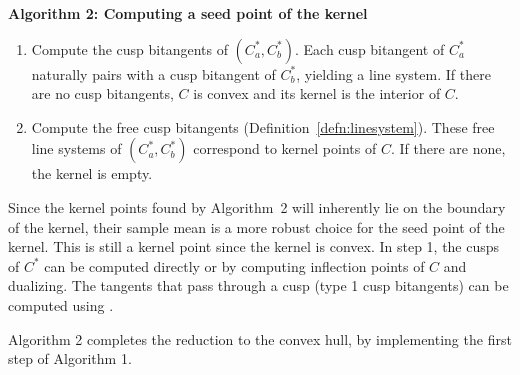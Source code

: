 \documentclass{sig-alternate}
\newcommand{\Comment}[1]{\relax}  %
\begin{document}
\vspace{.2in}

\centerline{{\bf Algorithm 2: Computing a seed point of the kernel}}

\begin{enumerate}
\item	Compute the cusp bitangents of $(C_a^*, C_b^*)$.
	Each cusp bitangent of $C^*_a$ naturally pairs with a cusp bitangent
	of $C^*_b$, yielding a line system.
	If there are no cusp bitangents, $C$ is convex and its kernel is the interior of $C$.
\item	Compute the free cusp bitangents (Definition~\ref{defn:linesystem}).
	These free line systems of $(C^*_a, C^*_b)$ correspond
	to kernel points of $C$.
	If there are none, the kernel is empty.
\Comment{
\item	Compute the cusps of $C^*$ \cite{manocha92}.
	If there are none, $C$ must be convex and its kernel is the interior of $C$.
\item	Compute the cusp bitangents of $C^*$.
	The tangents of a curve that pass through a point (in this case, a cusp)
	can be computed using \cite{jj01ACMSE}.
\item   Intersect each cusp bitangent with $C^*$ to test for freedom.
\item	The free cusp bitangents dualize to kernel points of $C$.
	If there are none, the kernel is empty.
}
\end{enumerate}

Since the kernel points found by Algorithm~2
will inherently lie on the boundary of the kernel,
their sample mean is a more robust choice for the seed point of the kernel.
This is still a kernel point since the kernel is convex.
In step 1, the cusps of $C^*$ can be computed directly \cite{manocha92}
or by computing inflection points of $C$ and dualizing.
The tangents that pass through a cusp (type 1 cusp bitangents)
can be computed using \cite{jj01ACMSE}.

Algorithm 2 completes the reduction to the convex hull,
by implementing the first step of Algorithm 1.

\end{document}
